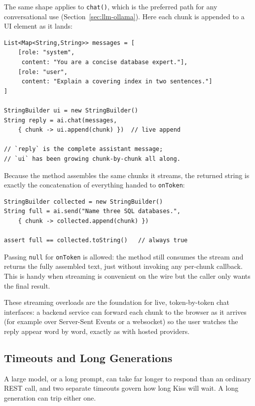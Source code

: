 \noindent
The same shape applies to \texttt{chat()}, which is the preferred path for any conversational use (Section~\ref{sec:llm-ollama}).  Here each chunk is appended to a UI element as it lands:

\begin{lstlisting}[style=groovy]
List<Map<String,String>> messages = [
    [role: "system",
     content: "You are a concise database expert."],
    [role: "user",
     content: "Explain a covering index in two sentences."]
]

StringBuilder ui = new StringBuilder()
String reply = ai.chat(messages,
    { chunk -> ui.append(chunk) })  // live append

// `reply` is the complete assistant message;
// `ui` has been growing chunk-by-chunk all along.
\end{lstlisting}

\noindent
Because the method assembles the same chunks it streams, the returned string is exactly the concatenation of everything handed to \texttt{onToken}:

\begin{lstlisting}[style=groovy]
StringBuilder collected = new StringBuilder()
String full = ai.send("Name three SQL databases.",
    { chunk -> collected.append(chunk) })

assert full == collected.toString()   // always true
\end{lstlisting}

\begin{tipbox}
Passing \texttt{null} for \texttt{onToken} is allowed: the method still consumes the stream and returns the fully assembled text, just without invoking any per-chunk callback.  This is handy when streaming is convenient on the wire but the caller only wants the final result.
\end{tipbox}

\noindent
These streaming overloads are the foundation for live, token-by-token chat interfaces: a backend service can forward each chunk to the browser as it arrives (for example over Server-Sent Events or a websocket) so the user watches the reply appear word by word, exactly as with hosted providers.

\subsection{Timeouts and Long Generations}

A large model, or a long prompt, can take far longer to respond than an ordinary
REST call, and two separate timeouts govern how long Kiss will wait.  A long
generation can trip either one.

